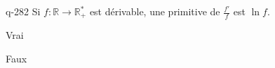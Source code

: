 \begin{truefalse}{q-282}
Si $f : \mathbb R \to \mathbb R^*_+$ est dérivable, une primitive de $\frac{f'}{f}$ est $\ln f$.
\item* Vrai
\item Faux
\end{truefalse}


